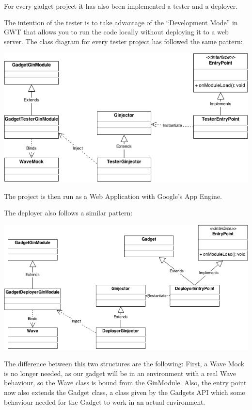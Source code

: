 For every gadget project it has also been implemented a tester and a deployer.

The intention of the tester is to take advantage of the ``Development Mode'' in GWT that allows you to run the code locally without deploying it to a web server. The class diagram for every tester project has followed the same pattern:

\begin{center}
\includegraphics[keepaspectratio, scale=0.6]{Media/Diagrams/Gadget/Tester.png}
\end{center}

The project is then run as a Web Application with Google's App Engine.

The deployer also follows a similar pattern:

\begin{center}
\includegraphics[keepaspectratio, scale=0.5]{Media/Diagrams/Gadget/Deployer.png}
\end{center}

The difference between this two structures are the following: First, a Wave Mock is no longer needed, as our gadget will be in an environment with a real Wave behaviour, so the Wave class is bound from the GinModule. Also, the entry point now also extends the Gadget class, a class given by the Gadgets API which some behaviour needed for the Gadget to work in an actual environment.





